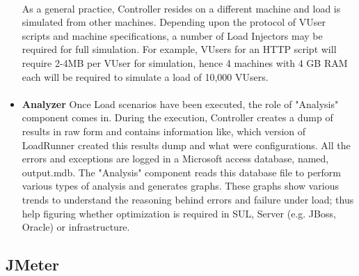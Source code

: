 \documentclass[../thesis.tex]{subfiles}
\begin{document}
\begin{itemize}
  \paragraph{}
  As a general practice, Controller resides on a different machine and load is simulated from other machines. Depending upon the protocol of VUser scripts and machine specifications, a number of Load Injectors may be required for full simulation. For example, VUsers for an HTTP script will require 2-4MB per VUser for simulation, hence 4 machines with 4 GB RAM each will be required to simulate a load of 10,000 VUsers.
  \paragraph{}
  \item \textbf{Analyzer} Once Load scenarios have been executed, the role of "Analysis" component comes in. During the execution, Controller creates a dump of results in raw form and contains information like, which version of LoadRunner created this results dump and what were configurations. All the errors and exceptions are logged in a Microsoft access database, named, output.mdb. The "Analysis" component reads this database file to perform various types of analysis and generates graphs.
  These graphs show various trends to understand the reasoning behind errors and failure under load; thus help figuring whether optimization is required in SUL, Server (e.g. JBoss, Oracle) or infrastructure.
\end{itemize}
\subsection{JMeter}
\end{document}
